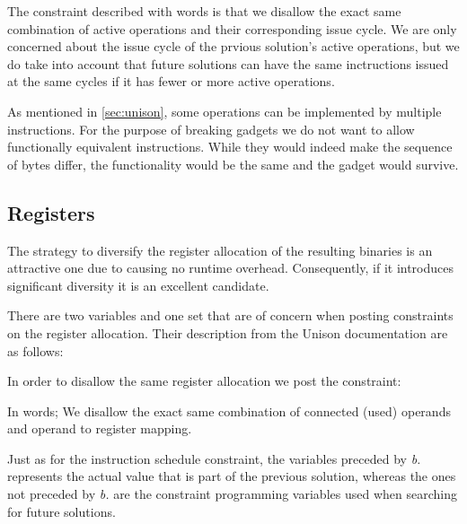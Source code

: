 The constraint described with words is that we disallow the exact same combination of
active operations and their corresponding issue cycle. We are only concerned about the
issue cycle of the prvious solution's active operations, but we do take into account that
future solutions can have the same inctructions issued at the same cycles if it has fewer
or more active operations.

As mentioned in \ref{sec:unison}, some operations can be implemented by multiple
instructions. For the purpose of breaking gadgets we do not want to allow functionally
equivalent instructions. While they would indeed make the sequence of bytes differ, the
functionality would be the same and the gadget would survive.

\subsection{Registers}

The strategy to diversify the register allocation of the resulting binaries is an attractive
one due to causing no runtime overhead. Consequently, if it introduces significant diversity
it is an excellent candidate.

There are two variables and one set that are of concern when posting constraints on the register
allocation. Their description from the Unison documentation are as follows:

\vspace{0.2cm}

\noindent{}

\vspace{0.2cm}

In order to disallow the same register allocation we post the constraint:

\vspace{0.2cm}
\noindent{}
\vspace{0.2cm}

In words; We disallow the exact same combination of connected (used) operands and
operand to register mapping.

Just as for the instruction schedule constraint, the variables preceded by \textit{b.}
represents the actual value that is part of the previous solution, whereas the ones not
preceded by \textit{b.} are the constraint programming variables used when searching for
future solutions.
